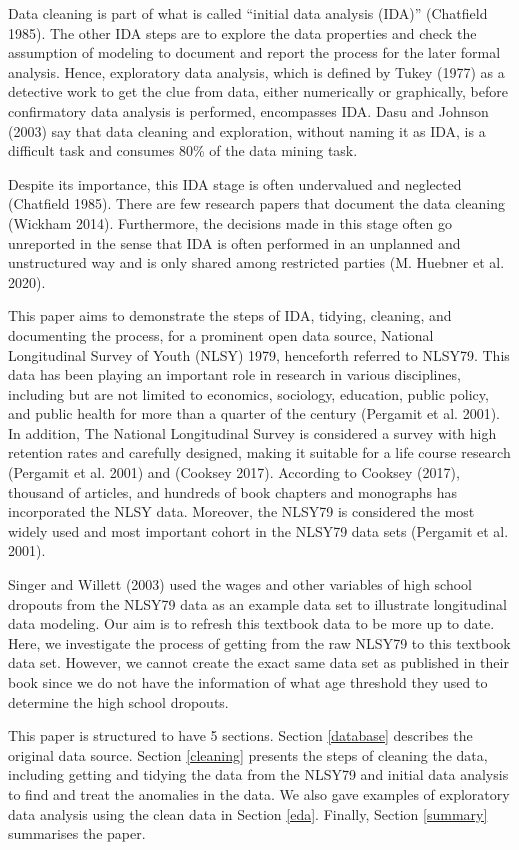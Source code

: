 \documentclass{article}
\begin{document}
Data cleaning is part of what is called ``initial data analysis (IDA)'' (Chatfield 1985). The other IDA steps are to explore the data properties and check the assumption of modeling to document and report the process for the later formal analysis. Hence, exploratory data analysis, which is defined by Tukey (1977) as a detective work to get the clue from data, either numerically or graphically, before confirmatory data analysis is performed, encompasses IDA. Dasu and Johnson (2003) say that data cleaning and exploration, without naming it as IDA, is a difficult task and consumes 80\% of the data mining task.

Despite its importance, this IDA stage is often undervalued and neglected (Chatfield 1985). There are few research papers that document the data cleaning (Wickham 2014). Furthermore, the decisions made in this stage often go unreported in the sense that IDA is often performed in an unplanned and unstructured way and is only shared among restricted parties (M. Huebner et al. 2020).

This paper aims to demonstrate the steps of IDA, tidying, cleaning, and documenting the process, for a prominent open data source, National Longitudinal Survey of Youth (NLSY) 1979, henceforth referred to NLSY79. This data has been playing an important role in research in various disciplines, including but are not limited to economics, sociology, education, public policy, and public health for more than a quarter of the century (Pergamit et al. 2001). In addition, The National Longitudinal Survey is considered a survey with high retention rates and carefully designed, making it suitable for a life course research (Pergamit et al. 2001) and (Cooksey 2017). According to Cooksey (2017), thousand of articles, and hundreds of book chapters and monographs has incorporated the NLSY data. Moreover, the NLSY79 is considered the most widely used and most important cohort in the NLSY79 data sets (Pergamit et al. 2001).

Singer and Willett (2003) used the wages and other variables of high school dropouts from the NLSY79 data as an example data set to illustrate longitudinal data modeling. Our aim is to refresh this textbook data to be more up to date. Here, we investigate the process of getting from the raw NLSY79 to this textbook data set. However, we cannot create the exact same data set as published in their book since we do not have the information of what age threshold they used to determine the high school dropouts.

This paper is structured to have 5 sections. Section \ref{database} describes the original data source. Section \ref{cleaning} presents the steps of cleaning the data, including getting and tidying the data from the NLSY79 and initial data analysis to find and treat the anomalies in the data. We also gave examples of exploratory data analysis using the clean data in Section \ref{eda}. Finally, Section \ref{summary} summarises the paper.
\end{document}
